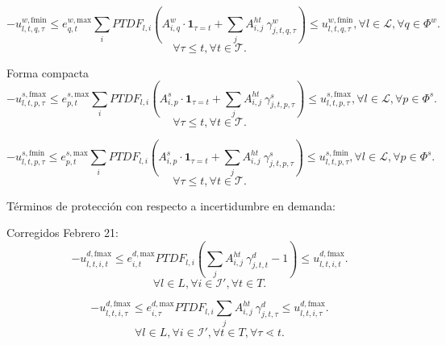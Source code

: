 \begin{equation}
-u_{l,t,q,\tau}^{w,\text{fmin}} \le e_{q,t}^{w, \text{max}} \sum_{i}PTDF_{l,i} \left( A_{i,q}^w \cdot \mathbf{1}_{\tau = t} + \sum_{j}A_{i,j}^{ht} \: \gamma_{j,t,q,\tau}^{w} \right) \le u_{l,t,q,\tau}^{w,\text{fmin}} , \forall l \in \mathcal{L}, \forall q \in \Phi^{w}.
\end{equation}
\begin{equation*}
    \forall \tau \leq t, \forall t \in \mathcal{T}.
\end{equation*}

Forma compacta
\begin{equation}
-u_{l,t,p,\tau}^{s,\text{fmax}} \le e_{p,t}^{s, \text{max}} \sum_{i}PTDF_{l,i} \left( A_{i,p}^s \cdot \mathbf{1}_{\tau = t} + \sum_{j}A_{i,j}^{ht} \: \gamma_{j,t,p,\tau}^{s} \right) \le u_{l,t,p,\tau}^{s,\text{fmax}} , \forall l \in \mathcal{L}, \forall p \in \Phi^{s}.
\end{equation}
\begin{equation*}
    \forall \tau \leq t, \forall t \in \mathcal{T}.
\end{equation*}

\begin{equation}
-u_{l,t,p,\tau}^{s,\text{fmin}} \le e_{p,t}^{s, \text{max}} \sum_{i}PTDF_{l,i} \left( A_{i,p}^s \cdot \mathbf{1}_{\tau = t} + \sum_{j}A_{i,j}^{ht} \: \gamma_{j,t,p,\tau}^{s} \right) \le u_{l,t,p,\tau}^{s,\text{fmin}} , \forall l \in \mathcal{L}, \forall p \in \Phi^{s}.
\end{equation}
\begin{equation*}
    \forall \tau \leq t, \forall t \in \mathcal{T}.
\end{equation*}

Términos de protección con respecto a incertidumbre en demanda:

Corregidos Febrero 21:
\begin{equation}
-u_{l,t,i,t}^{d,\text{fmax}} \le e_{i,t}^{d, \text{max}} PTDF_{l,i} \left( \sum_{j}A_{i,j}^{ht} \: \gamma_{j,t,t}^{d} - 1 \right ) \le u_{l,t,i,t}^{d,\text{fmax}}.
\end{equation}
\begin{equation*}
    \forall l \in L, \forall i \in \mathcal{I}', \forall t \in T.
\end{equation*}

\begin{equation}
-u_{l,t,i,\tau}^{d,\text{fmax}} \le e_{i,\tau}^{d, \text{max}} PTDF_{l,i} \sum_{j}A_{i,j}^{ht} \: \gamma_{j,t,\tau}^{d} \le u_{l,t,i,\tau}^{d,\text{fmax}}.
\end{equation}
\begin{equation*}
    \forall l \in L, \forall i \in \mathcal{I}', \forall t \in T, \forall \tau \lessdot t.
\end{equation*}


